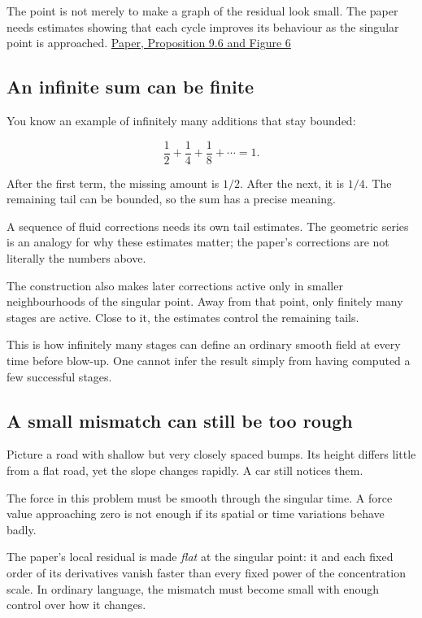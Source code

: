 \documentclass[
  english,
  11pt,
]{article}
\begin{document}
The point is not merely to make a graph of the residual look small. The
paper needs estimates showing that each cycle improves its behaviour as
the singular point is approached.
\href{https://cdn.openai.com/pdf/32d9f210-8b73-45e0-91bc-82a30aef8a9a/navier-stokes.pdf\#page=15}{Paper,
Proposition 9.6 and Figure 6}

\subsection{An infinite sum can be
finite}\label{an-infinite-sum-can-be-finite}

You know an example of infinitely many additions that stay bounded:

\[
\frac12+\frac14+\frac18+\cdots=1.
\]

After the first term, the missing amount is \(1/2\). After the next, it
is \(1/4\). The remaining tail can be bounded, so the sum has a precise
meaning.

A sequence of fluid corrections needs its own tail estimates. The
geometric series is an analogy for why these estimates matter; the
paper's corrections are not literally the numbers above.

The construction also makes later corrections active only in smaller
neighbourhoods of the singular point. Away from that point, only
finitely many stages are active. Close to it, the estimates control the
remaining tails.

This is how infinitely many stages can define an ordinary smooth field
at every time before blow-up. One cannot infer the result simply from
having computed a few successful stages.

\subsection{A small mismatch can still be too
rough}\label{a-small-mismatch-can-still-be-too-rough}

Picture a road with shallow but very closely spaced bumps. Its height
differs little from a flat road, yet the slope changes rapidly. A car
still notices them.

The force in this problem must be smooth through the singular time. A
force value approaching zero is not enough if its spatial or time
variations behave badly.

The paper's local residual is made \emph{flat} at the singular point: it
and each fixed order of its derivatives vanish faster than every fixed
power of the concentration scale. In ordinary language, the mismatch
must become small with enough control over how it changes.
\end{document}

